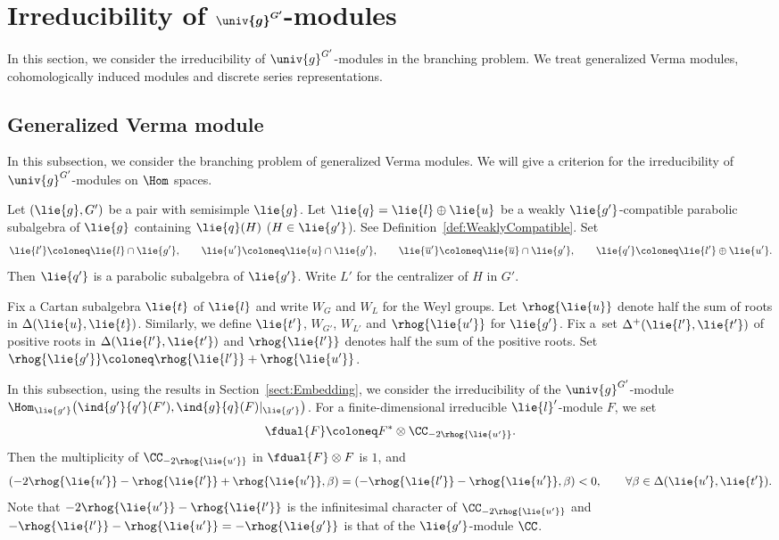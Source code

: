 \section[Irreducibility of U(g)\^{}{G'}-modules]{Irreducibility of $\boldsymbol{\univ{g}^{G'}}$-modules}

In this section, we consider the irreducibility of $\univ{g}^{G'}$-modules in the branching problem.
We treat generalized Verma modules, cohomologically induced modules and discrete series representations.

\subsection{Generalized Verma module}

In this subsection, we consider the branching problem of generalized Verma modules.
We will give a criterion for the irreducibility of $\univ{g}^{G'}$-modules on $\Hom$ spaces.

Let $(\lie{g}, G')$ be a pair with semisimple $\lie{g}$.
Let $\lie{q} = \lie{l}\oplus \lie{u}$ be a weakly $\lie{g'}$-compatible parabolic subalgebra of $\lie{g}$
containing $\lie{q}(H)$ ($H \in \lie{g'}$).
See Definition~\ref{def:WeaklyCompatible}.
Set
\begin{align*}
	\lie{l'}\coloneq \lie{l}\cap \lie{g'}, \qquad \lie{u'}\coloneq \lie{u}\cap \lie{g'}, \qquad \lie{\overline{u}'}\coloneq \lie{\overline{u}}\cap \lie{g'}, \qquad \lie{q'}\coloneq \lie{l'}\oplus \lie{u'}.
\end{align*}
Then $\lie{q'}$ is a parabolic subalgebra of $\lie{g'}$.
Write $L'$ for the centralizer of $H$ in $G'$.

Fix a Cartan subalgebra $\lie{t}$ of $\lie{l}$ and write $W_{G}$ and $W_L$ for the Weyl groups.
Let $\rhog{\lie{u}}$ denote half the sum of roots in $\Delta(\lie{u}, \lie{t})$.
Similarly, we define $\lie{t'}$, $W_{G'}$, $W_{L'}$ and $\rhog{\lie{u'}}$ for $\lie{g'}$.
Fix a~set $\Delta^+(\lie{l'}, \lie{t'})$ of positive roots in $\Delta(\lie{l'}, \lie{t'})$
and $\rhog{\lie{l'}}$ denotes half the sum of the positive roots.
Set~${\rhog{\lie{g'}} \coloneq \rhog{\lie{l'}} + \rhog{\lie{u'}}}$.

In this subsection, using the results in Section~\ref{sect:Embedding}, we consider the irreducibility of the $\univ{g}^{G'}$-module
$\Hom_{\lie{g'}}\bigl(\ind{g'}{q'}(F'), \ind{g}{q}(F)|_{\lie{g'}}\bigr)$.
For a finite-dimensional irreducible $\lie{l}'$-module $F$, we set
\begin{align*}
	\fdual{F} \coloneq F^* \otimes \CC_{-2\rhog{\lie{u'}}}.
\end{align*}
Then the multiplicity of $\CC_{-2\rhog{\lie{u'}}}$ in $\fdual{F}\otimes F$ is $1$, and
\begin{align*}
	(-2\rhog{\lie{u'}} - \rhog{\lie{l'}} + \rhog{\lie{u'}}, \beta) = (-\rhog{\lie{l'}} - \rhog{\lie{u'}}, \beta) < 0, \qquad \forall \beta \in \Delta(\lie{u'}, \lie{t'}).
\end{align*}
Note that $-2\rhog{\lie{u'}} - \rhog{\lie{l'}}$ is the infinitesimal character of $\CC_{-2\rhog{\lie{u'}}}$
and $-\rhog{\lie{l'}} - \rhog{\lie{u'}} = -\rhog{\lie{g'}}$ is that of the $\lie{g'}$-module $\CC$.

